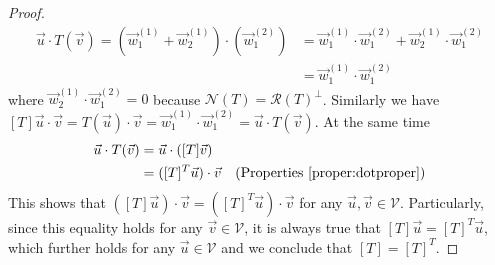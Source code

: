 \begin{proof}
\begin{align*}
\vec{u} \cdot T(\vec{v}) = (\vec{w}_1^{(1)} + \vec{w}_2^{(1)}) \cdot (\vec{w}_1^{(2)}) &= \vec{w}_1^{(1)} \cdot \vec{w}_1^{(2)} + \vec{w}_2^{(1)} \cdot \vec{w}_1^{(2)} \\
&= \vec{w}_1^{(1)} \cdot \vec{w}_1^{(2)}
\end{align*}
where $\vec{w}_2^{(1)} \cdot \vec{w}_1^{(2)} = 0$ because $\mathcal{N}(T) = \mathcal{R}(T)^\perp$. Similarly we have $[T]\vec{u} \cdot \vec{v} = T(\vec{u}) \cdot \vec{v} = \vec{w}_1^{(1)} \cdot \vec{w}_1^{(2)} = \vec{u} \cdot T(\vec{v})$. At the same time
\begin{align*}
\vec{u} \cdot T(\vec{v}) &= \vec{u} \cdot ([T]\vec{v}) \\
&= ([T]^T\vec{u}) \cdot \vec{v} & \text{(Properties \ref{proper:dotproper})}
\end{align*}
This shows that $([T]\vec{u}) \cdot \vec{v} = ([T]^T\vec{u}) \cdot \vec{v}$ for any $\vec{u}, \vec{v} \in \mathcal{V}$. Particularly, since this equality holds for any $\vec{v} \in \mathcal{V}$, it is always true that $[T]\vec{u} = [T]^T\vec{u}$, which further holds for any $\vec{u} \in \mathcal{V}$ and we conclude that $[T] = [T]^T$.
\end{proof}

